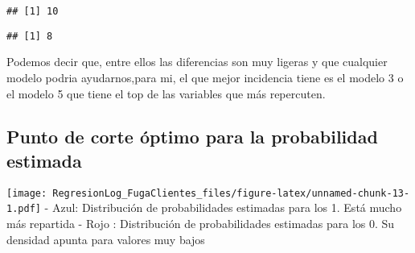 \documentclass[
]{article}
\newenvironment{Shaded}{\begin{snugshade}}{\end{snugshade}}
\newcommand{\AttributeTok}[1]{\textcolor[rgb]{0.77,0.63,0.00}{#1}}
\newcommand{\CommentTok}[1]{\textcolor[rgb]{0.56,0.35,0.01}{\textit{#1}}}
\newcommand{\DocumentationTok}[1]{\textcolor[rgb]{0.56,0.35,0.01}{\textbf{\textit{#1}}}}
\newcommand{\FunctionTok}[1]{\textcolor[rgb]{0.00,0.00,0.00}{#1}}
\newcommand{\NormalTok}[1]{#1}
\newcommand{\SpecialCharTok}[1]{\textcolor[rgb]{0.00,0.00,0.00}{#1}}
\newcommand{\StringTok}[1]{\textcolor[rgb]{0.31,0.60,0.02}{#1}}
\begin{document}
\begin{Shaded}
\end{Shaded}

\begin{verbatim}
## [1] 10
\end{verbatim}

\begin{Shaded}
\end{Shaded}

\begin{verbatim}
## [1] 8
\end{verbatim}

Podemos decir que, entre ellos las diferencias son muy ligeras y que
cualquier modelo podria ayudarnos,para mi, el que mejor incidencia tiene
es el modelo 3 o el modelo 5 que tiene el top de las variables que más
repercuten.

\hypertarget{punto-de-corte-uxf3ptimo-para-la-probabilidad-estimada}{%
\subsection{Punto de corte óptimo para la probabilidad
estimada}\label{punto-de-corte-uxf3ptimo-para-la-probabilidad-estimada}}

\begin{Shaded}
\end{Shaded}

\texttt{[image: RegresionLog\_FugaClientes\_files/figure-latex/unnamed-chunk-13-1.pdf]}
- Azul: Distribución de probabilidades estimadas para los 1. Está mucho
más repartida - Rojo : Distribución de probabilidades estimadas para los
0. Su densidad apunta para valores muy bajos
\end{document}
